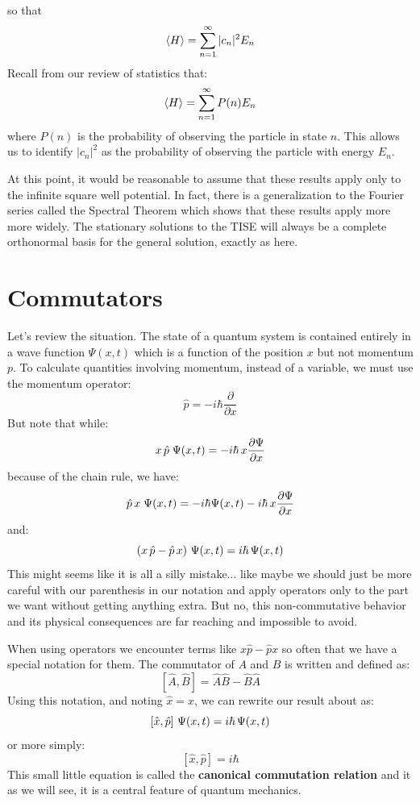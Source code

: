 \documentclass[12pt]{book}
\begin{document}
so that  
\begin{equation}  
\braket{H} = \sum_{n=1}^{\infty} |c_n|^2 E_n
\end{equation}
Recall from our review of statistics that:
\begin{equation}  
\braket{H} = \sum_{n=1}^{\infty} P(n) E_n
\end{equation}
where $P(n)$ is the probability of observing the particle in state $n$.  This allows us to identify $|c_n|^2$ as the probability of observing the particle with energy $E_n$.

At this point, it would be reasonable to assume that these results apply only to the infinite square well potential.  In fact, there is a generalization to the Fourier series called the Spectral Theorem which shows that these results apply more more widely.  The stationary solutions to the TISE will always be a complete orthonormal basis for the general solution, exactly as here. 

\section{Commutators}

Let's review the situation.  The state of a quantum system is contained entirely in a wave function $\Psi(x,t)$ which is a function of the position $x$ but not momentum $p$.  To calculate quantities involving momentum, instead of a variable, we must use the momentum operator:
$$\hat{p} = -i \hbar \frac{\partial}{\partial x}$$
But note that while:
$$ x \, \hat{p} \; \Psi(x, t) = -i \hbar \, x \frac{\partial \Psi}{\partial x}$$
because of the chain rule, we have:
$$ \hat{p} \, x \; \Psi(x, t) = -i \hbar \Psi(x,t) - i \hbar \, x \frac{\partial \Psi}{\partial x}$$
and:
$$ \left( x \, \hat{p} - \hat{p} \, x \right) \, \Psi(x, t) = i \hbar \, \Psi(x,t) $$
This might seems like it is all a silly mistake... like maybe we should just be more careful with our parenthesis in our notation and apply operators only to the part we want without getting anything extra.  But no, this non-commutative behavior and its physical consequences are far reaching and impossible to avoid.

When using operators we encounter terms like $x\hat{p} - \hat{p}x$ so often that we have a special notation for them.  The commutator of $A$ and $B$ is written and defined as:
\begin{equation}
\label{eqn:commutator}
\left[\hat{A}, \hat{B}\right] = \hat{A} \hat{B} - \hat{B} \hat{A} 
\end{equation}
Using this notation, and noting $\hat{x}=x$, we can rewrite our result about as:
$$ \left[ \hat{x} , \hat{p} \right] \, \Psi(x, t) = i \hbar \, \Psi(x,t) $$
or more simply:
\begin{equation}
\label{eqn:pxcom}
\left[\hat{x}, \hat{p}\right] = i \hbar 
\end{equation}
This small little equation is called the {\bf canonical commutation relation} and it as we will see, it is a central feature of quantum mechanics.
\end{document}
